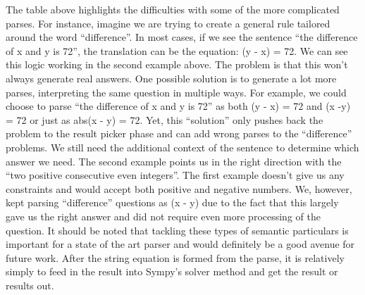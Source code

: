 \documentclass[11pt]{article}
\begin{document}
The table above highlights the difficulties with some of the more complicated parses. For instance, imagine we are trying to create a general rule tailored around the word ``difference''. In most cases, if we see the sentence ``the difference of x and y is 72'', the translation can be the equation: (y - x) = 72. We can see this logic working in the second example above. The problem is that this won’t always generate real answers. One possible solution is to generate a lot more parses, interpreting the same question in multiple ways. For example, we could choose to parse ``the difference of x and y is 72'' as both (y - x) = 72 and (x -y) = 72 or just as abs(x - y) = 72. Yet, this ``solution'' only pushes back the problem to the result picker phase and can add wrong parses to the ``difference'' problems. We still need the additional context of the sentence to determine which answer we need. The second example points us in the right direction with the ``two positive consecutive even integers''. The first example doesn’t give us any constraints and would accept both positive and negative numbers. We, however, kept parsing ``difference'' questions as (x - y) due to the fact that this largely gave us the right answer and  did not require even more processing of the question. It should be noted that tackling these types of semantic particulars is important for a state of the art parser and would definitely be a good avenue for future work. After the string equation is formed from the parse, it is relatively simply to feed in the result into Sympy’s solver method and get the result or results out.
\end{document}
